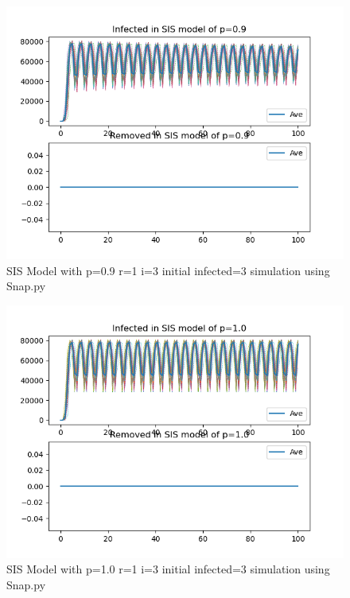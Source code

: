 \documentclass{subfile}
\begin{document}
  \begin{figure}
  \includegraphics[scale=0.8]{sisp09r1i3s3}
  \caption[SIS p=0.9,r=1,i=3,init infected=3]{SIS Model with p=0.9 r=1 i=3 initial infected=3 simulation using Snap.py}
  \end{figure}
  \begin{figure}
  \includegraphics[scale=0.8]{sisp10r1i3s3}
  \caption[SIS p=1.0,r=1,i=3,init infected=3]{SIS Model with p=1.0 r=1 i=3 initial infected=3 simulation using Snap.py}
  \end{figure}
  \newpage
\end{document}
